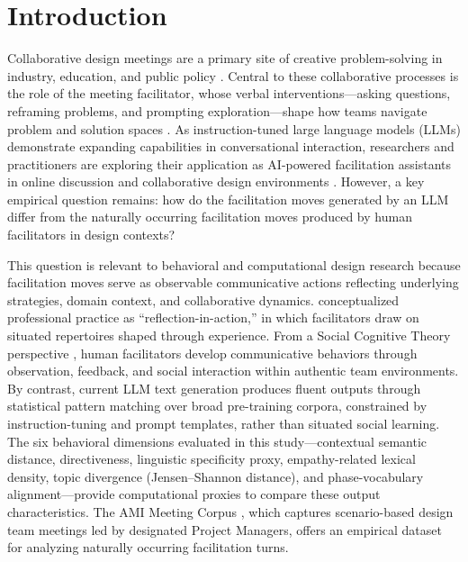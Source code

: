 \documentclass[preprint,12pt,authoryear]{elsarticle}
\begin{document}
\linenumbers

\section{Introduction}

Collaborative design meetings are a primary site of creative problem-solving in industry, education, and public policy \citep{brown2008, cross2011}. Central to these collaborative processes is the role of the meeting facilitator, whose verbal interventions---asking questions, reframing problems, and prompting exploration---shape how teams navigate problem and solution spaces \citep{seidel2013, starostka2021}. As instruction-tuned large language models (LLMs) demonstrate expanding capabilities in conversational interaction, researchers and practitioners are exploring their application as AI-powered facilitation assistants in online discussion \citep{korre2025} and collaborative design environments \citep{gmeiner2023}. However, a key empirical question remains: how do the facilitation moves generated by an LLM differ from the naturally occurring facilitation moves produced by human facilitators in design contexts?

This question is relevant to behavioral and computational design research because facilitation moves serve as observable communicative actions reflecting underlying strategies, domain context, and collaborative dynamics. \citet{schon1983} conceptualized professional practice as ``reflection-in-action,'' in which facilitators draw on situated repertoires shaped through experience. From a Social Cognitive Theory perspective \citep{bandura1986social}, human facilitators develop communicative behaviors through observation, feedback, and social interaction within authentic team environments. By contrast, current LLM text generation produces fluent outputs through statistical pattern matching over broad pre-training corpora, constrained by instruction-tuning and prompt templates, rather than situated social learning. The six behavioral dimensions evaluated in this study---contextual semantic distance, directiveness, linguistic specificity proxy, empathy-related lexical density, topic divergence (Jensen--Shannon distance), and phase-vocabulary alignment---provide computational proxies to compare these output characteristics. The AMI Meeting Corpus \citep{carletta2005ami}, which captures scenario-based design team meetings led by designated Project Managers, offers an empirical dataset for analyzing naturally occurring facilitation turns.
\end{document}
